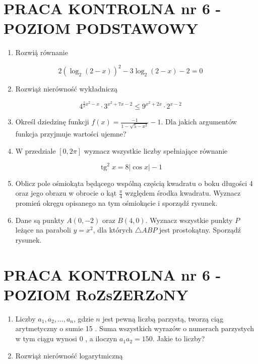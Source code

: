\documentclass[10pt]{article}
\begin{document}
\section*{PRACA KONTROLNA nr 6 - POZIOM PODSTAWOWY}
\begin{enumerate}
  \item Rozwią̇̇ równanie
\end{enumerate}

$$
2\left(\log _{2}(2-x)\right)^{2}-3 \log _{2}(2-x)-2=0
$$

\begin{enumerate}
  \setcounter{enumi}{1}
  \item Rozwiąż nierówność wykładniczą
\end{enumerate}

$$
4^{\frac{1}{2} x^{2}-x} \cdot 3^{x^{2}+7 x-2} \leqslant 9^{x^{2}+2 x} \cdot 2^{x-2}
$$

\begin{enumerate}
  \setcounter{enumi}{2}
  \item Określ dziedzinę funkcji $f(x)=\frac{-1}{1-\sqrt{5-x^{2}}}-1$. Dla jakich argumentów funkcja przyjmuje wartości ujemne?
  \item W przedziale $[0,2 \pi]$ wyznacz wszystkie liczby spełniające równanie
\end{enumerate}

$$
\operatorname{tg}^{2} x=8|\cos x|-1
$$

\begin{enumerate}
  \setcounter{enumi}{4}
  \item Oblicz pole ośmiokąta będącego wspólną częścią kwadratu o boku długości 4 oraz jego obrazu w obrocie o kąt $\frac{\pi}{4}$ względem środka kwadratu. Wyznacz promień okręgu opisanego na tym ośmiokącie i sporządź rysunek.
  \item Dane są punkty $A(0,-2)$ oraz $B(4,0)$. Wyznacz wszystkie punkty $P$ leżące na paraboli $y=x^{2}$, dla których $\triangle A B P$ jest prostokątny. Sporządź rysunek.
\end{enumerate}

\section*{PRACA KONTROLNA nr 6 - POZIOM RoZsZERZoNY}
\begin{enumerate}
  \item Liczby $a_{1}, a_{2}, \ldots, a_{n}$, gdzie $n$ jest pewną liczbą parzystą, tworzą ciąg arytmetyczny o sumie 15 . Suma wszystkich wyrazów o numerach parzystych w tym ciągu wynosi 0 , a iloczyn $a_{1} a_{2}=150$. Jakie to liczby?
  \item Rozwiąż nierówność logarytmiczną
\end{enumerate}
\end{document}
